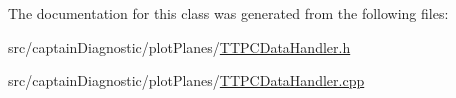 The documentation for this class was generated from the following files\+:\begin{DoxyCompactItemize}
\item 
src/captain\+Diagnostic/plot\+Planes/\hyperlink{_t_t_p_c_data_handler_8h}{T\+T\+P\+C\+Data\+Handler.\+h}\item 
src/captain\+Diagnostic/plot\+Planes/\hyperlink{_t_t_p_c_data_handler_8cpp}{T\+T\+P\+C\+Data\+Handler.\+cpp}\end{DoxyCompactItemize}
